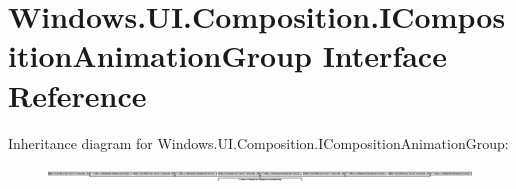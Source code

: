 \hypertarget{interface_windows_1_1_u_i_1_1_composition_1_1_i_composition_animation_group}{}\section{Windows.\+U\+I.\+Composition.\+I\+Composition\+Animation\+Group Interface Reference}
\label{interface_windows_1_1_u_i_1_1_composition_1_1_i_composition_animation_group}
Inheritance diagram for Windows.\+U\+I.\+Composition.\+I\+Composition\+Animation\+Group\+:\begin{figure}[H]
\begin{center}
\leavevmode
\includegraphics[height=0.363047cm]{interface_windows_1_1_u_i_1_1_composition_1_1_i_composition_animation_group}
\end{center}
\end{figure}
